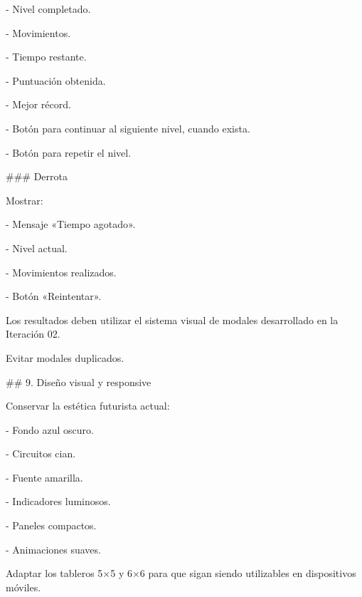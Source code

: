 \par\smallskip
\noindent - Nivel completado.\par
\noindent - Movimientos.\par
\noindent - Tiempo restante.\par
\noindent - Puntuación obtenida.\par
\noindent - Mejor récord.\par
\noindent - Botón para continuar al siguiente nivel, cuando exista.\par
\noindent - Botón para repetir el nivel.\par
\par\smallskip
\noindent \#\#\# Derrota\par
\par\smallskip
\noindent Mostrar:\par
\par\smallskip
\noindent - Mensaje «Tiempo agotado».\par
\noindent - Nivel actual.\par
\noindent - Movimientos realizados.\par
\noindent - Botón «Reintentar».\par
\par\smallskip
\noindent Los resultados deben utilizar el sistema visual de modales desarrollado en la Iteración 02.\par
\par\smallskip
\noindent Evitar modales duplicados.\par
\par\smallskip
\noindent \#\# 9. Diseño visual y responsive\par
\par\smallskip
\noindent Conservar la estética futurista actual:\par
\par\smallskip
\noindent - Fondo azul oscuro.\par
\noindent - Circuitos cian.\par
\noindent - Fuente amarilla.\par
\noindent - Indicadores luminosos.\par
\noindent - Paneles compactos.\par
\noindent - Animaciones suaves.\par
\par\smallskip
\noindent Adaptar los tableros 5×5 y 6×6 para que sigan siendo utilizables en dispositivos móviles.\par
\par\smallskip

